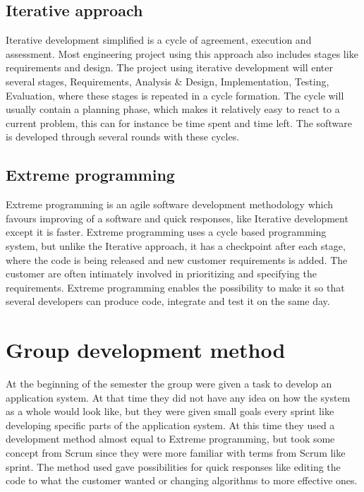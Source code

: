 \subsection{Iterative approach}
Iterative development simplified is a cycle of agreement, execution and assessment. Most engineering project using this approach also includes stages like requirements and design. The project using iterative development will enter several stages, Requirements, Analysis \& Design, Implementation, Testing, Evaluation, where these stages is repeated in a cycle formation. The cycle will usually contain a planning phase, which makes it relatively easy to react to a current problem, this can for instance be time spent and time left. The software is developed through several rounds with these cycles. 

\subsection{Extreme programming}
Extreme  programming is an agile software development methodology which favours improving of a software and quick responses, like Iterative development except it is faster. Extreme programming uses a cycle based programming system, but unlike the Iterative approach, it has a checkpoint after each stage, where the code is being released and new customer requirements is added. The customer are often intimately involved in prioritizing and specifying the requirements. Extreme programming enables the possibility to make it so that several developers can produce code, integrate and test it on the same day.  

\section{Group development method} 
At the beginning of the semester the group were given a task to develop an application system. At that time they did not have any idea on how the system as a whole would look like, but they were given small goals every sprint like developing specific parts of the application system. At this time they used a development method almost equal to Extreme programming, but took some concept from Scrum since they were more familiar with terms from Scrum like sprint. The method used gave possibilities for quick responses like editing the code to what the customer wanted or changing algorithms to more effective ones.


